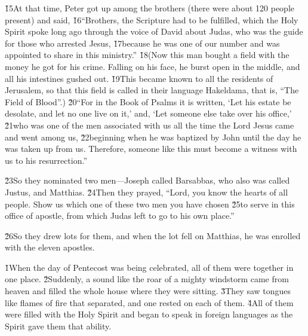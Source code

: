 \v{15}At that time, Peter got up among the brothers (there were about 120 people present) and said, \v{16}``Brothers, the Scripture had to be fulfilled, which the Holy Spirit spoke long ago through the voice of David about Judas, who was the guide for those who arrested Jesus, \v{17}because he was one of our number and was appointed to share in this ministry.'' \v{18}(Now this man bought a field with the money he got for his crime. Falling on his face, he burst open in the middle, and all his intestines gushed out. \v{19}This became known to all the residents of Jerusalem, so that this field is called in their language Hakeldama, that is, ``The Field of Blood''.) \v{20}``For in the Book of Psalms it is written, `Let his estate be desolate, and let no one live on it,' and, `Let someone else take over his office,' \v{21}who was one of the men associated with us all the time the Lord Jesus came and went among us, \v{22}beginning when he was baptized by John until the day he was taken up from us. Therefore, someone like this must become a witness with us to his resurrection.''

\v{23}So they nominated two men---Joseph called Barsabbas, who also was called Justus, and Matthias. \v{24}Then they prayed, ``Lord, you know the hearts of all people. Show us which one of these two men you have chosen \v{25}to serve in this office of apostle, from which Judas left to go to his own place.''

\v{26}So they drew lots for them, and when the lot fell on Matthias, he was enrolled with the eleven apostles.

\v{1}When the day of Pentecost was being celebrated, all of them were together in one place. \v{2}Suddenly, a sound like the roar of a mighty windstorm came from heaven and filled the whole house where they were sitting. \v{3}They saw tongues like flames of fire that separated, and one rested on each of them. \v{4}All of them were filled with the Holy Spirit and began to speak in foreign languages as the Spirit gave them that ability.

